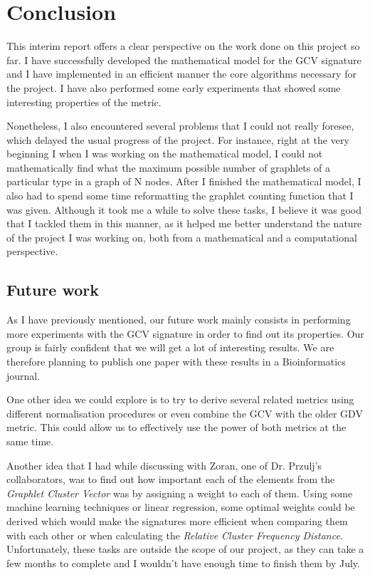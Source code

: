 \chapter{Conclusion}


This interim report offers a clear perspective on the work done on this project
so far. I have successfully developed the mathematical model for the GCV
signature and I have implemented in an efficient manner the core algorithms
necessary for the project. I have also performed some early experiments that
showed some interesting properties of the metric. 

Nonetheless, I also encountered several problems that I could not really
foresee, which delayed the usual progress of the project. For instance, right
at the very beginning I when I was working on the mathematical model, I could
not mathematically find what the maximum possible number of graphlets of a
particular type in a graph of N nodes. After I finished the mathematical model,
I also had to spend some time reformatting the graphlet counting function that I
was given. Although it took me a while to solve these tasks, I believe it was
good that I tackled them in this manner, as it helped me better understand the
nature of the project I was working on, both from a mathematical and a
computational perspective.
 
\section{Future work}

As I have previously mentioned, our future work mainly consists in performing
more experiments with the GCV signature in order to find out its properties.
Our group is fairly confident that we will get a lot of interesting results. We
are therefore planning to publish one paper with these results in a
Bioinformatics journal.

One other idea we could explore is to try to derive several related metrics
using different normalisation procedures or even combine the GCV with the older
GDV metric. This could allow us to effectively use the power of both metrics at
the same time. 

Another idea that I had while discussing with Zoran, one of Dr. Przulj's
collaborators, was to find out how important each of the elements from the
\emph{Graphlet Cluster Vector} was by assigning a weight to each of them. Using
some machine learning techniques or linear regression, some optimal weights
could be derived which would make the signatures more efficient when comparing
them with each other or when calculating the \emph{Relative Cluster Frequency
Distance}. Unfortunately, these tasks are outside the scope of our project, as
they can take a few months to complete and I wouldn't have enough time to finish
them by July. 

